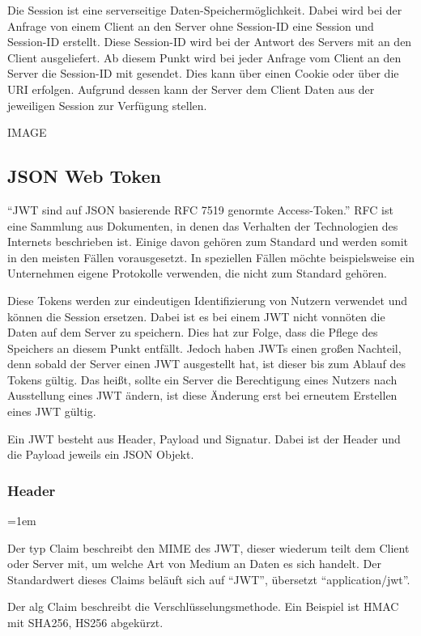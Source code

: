Die Session ist eine serverseitige Daten-Speichermöglichkeit. Dabei wird bei der Anfrage von einem Client an den Server ohne Session-ID eine Session und Session-ID erstellt. Diese Session-ID wird bei der Antwort des Servers mit an den Client ausgeliefert. Ab diesem Punkt wird bei jeder Anfrage vom Client an den Server die Session-ID mit gesendet. Dies kann über einen Cookie oder über die \gls{URI} erfolgen. Aufgrund dessen kann der Server dem Client Daten aus der jeweiligen Session zur Verfügung stellen.

IMAGE

\subsection{JSON Web Token}
\label{sec: jwt}
\enquote{\gls{JWT} sind auf \gls{JSON} basierende \gls{RFC} 7519 genormte Access-Token.} \gls{RFC} ist eine Sammlung aus Dokumenten, in denen das Verhalten der Technologien des Internets beschrieben ist. Einige davon gehören zum Standard und werden somit in den meisten Fällen vorausgesetzt. In speziellen Fällen möchte beispielsweise ein Unternehmen eigene Protokolle verwenden, die nicht zum Standard gehören.

Diese Tokens werden zur eindeutigen Identifizierung von Nutzern verwendet und können die Session ersetzen. Dabei ist es bei einem \gls{JWT} nicht vonnöten die Daten auf dem Server zu speichern. Dies hat zur Folge, dass die Pflege des Speichers an diesem Punkt entfällt. Jedoch haben \gls{JWT}s einen gro{\ss}en Nachteil, denn sobald der Server einen \gls{JWT} ausgestellt hat, ist dieser bis zum Ablauf des Tokens gültig. Das hei{\ss}t, sollte ein Server die Berechtigung eines Nutzers nach Ausstellung eines \gls{JWT} ändern, ist diese Änderung erst bei erneutem Erstellen eines \gls{JWT} gültig.

Ein \gls{JWT} besteht aus Header, Payload und Signatur. Dabei ist der Header und die Payload jeweils ein \gls{JSON} Objekt.

\subsubsection{Header}
\label{sec: jwt_header}

\begin{description}
	\leftskip=1em
	\item[typ] Der typ Claim beschreibt den \gls{MIME} des \gls{JWT}, dieser wiederum teilt dem Client oder Server mit, um welche Art von Medium an Daten es sich handelt. Der Standardwert dieses Claims beläuft sich auf \enquote{JWT}, übersetzt \enquote{application/jwt}.
	\item[alg] Der alg Claim beschreibt die Verschlüsselungsmethode. Ein Beispiel ist \gls{HMAC} mit \gls{SHA256}, HS256 abgekürzt.
\end{description}


